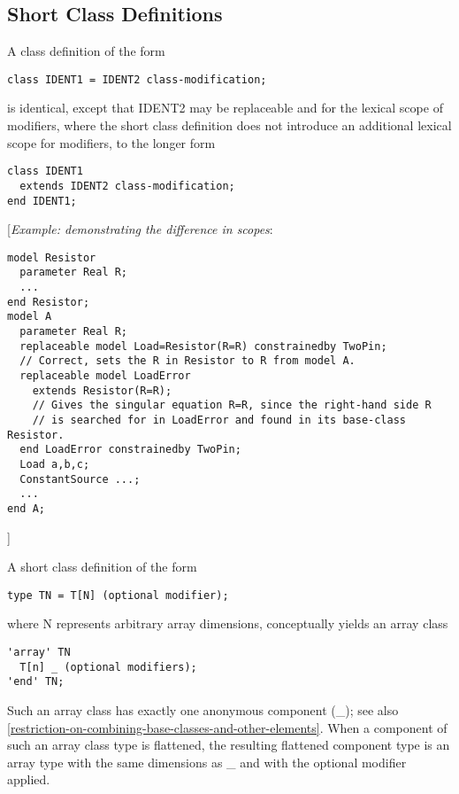 \subsection{Short Class Definitions}

A class definition of the form
\begin{lstlisting}[language=modelica]
class IDENT1 = IDENT2 class-modification;
\end{lstlisting}

is identical, except that IDENT2 may be replaceable and for the lexical
scope of modifiers, where the short class definition does not introduce
an additional lexical scope for modifiers, to the longer form

\begin{lstlisting}[language=modelica]
class IDENT1
  extends IDENT2 class-modification;
end IDENT1;
\end{lstlisting}

{[}\emph{Example: demonstrating the difference in scopes}:
\begin{lstlisting}[language=modelica]
model Resistor
  parameter Real R;
  ...
end Resistor;
model A
  parameter Real R;
  replaceable model Load=Resistor(R=R) constrainedby TwoPin;
  // Correct, sets the R in Resistor to R from model A.
  replaceable model LoadError
    extends Resistor(R=R);
    // Gives the singular equation R=R, since the right-hand side R
    // is searched for in LoadError and found in its base-class Resistor.
  end LoadError constrainedby TwoPin;
  Load a,b,c;
  ConstantSource ...;
  ...
end A;
\end{lstlisting}
{]}

A short class definition of the form
\begin{lstlisting}[language=modelica]
type TN = T[N] (optional modifier);
\end{lstlisting}

where N represents arbitrary array dimensions, conceptually yields an
array class

\begin{lstlisting}[language=modelica]
'array' TN
  T[n] _ (optional modifiers);
'end' TN;
\end{lstlisting}

Such an array class has exactly one anonymous component (\_); see also
\autoref{restriction-on-combining-base-classes-and-other-elements}.
When a component of such an array class type is
flattened, the resulting flattened component type is an array type with
the same dimensions as \_ and with the optional modifier applied.

